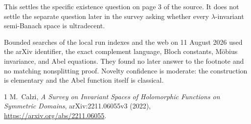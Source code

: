 \documentclass[11pt]{article}
\begin{document}
This settles the specific existence question on page 3 of the source.  It does
not settle the separate question later in the survey asking whether every
$\lambda$-invariant semi-Banach space is ultradecent.

Bounded searches of the local run indexes and the web on 11 August 2026 used
the arXiv identifier, the exact complement language, Bloch constants,
M\"obius invariance, and Abel equations.  They found no later answer to the
footnote and no matching nonsplitting proof.  Novelty confidence is moderate:
the construction is elementary and the Abel function itself is classical.

\begin{thebibliography}{1}
M.~Calzi, \emph{A Survey on Invariant Spaces of Holomorphic Functions on
Symmetric Domains}, arXiv:2211.06055v3 (2022),
\url{https://arxiv.org/abs/2211.06055}.
\end{thebibliography}
\end{document}
